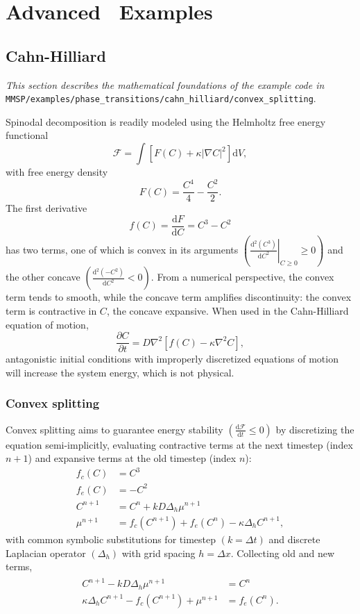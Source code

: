 
\chapter{Advanced \MMSP\ Examples}\label{ch:advanced}

\section{Cahn-Hilliard}
	\emph{This section describes the mathematical foundations of the example code in }
	{\tt MMSP/examples/phase\_transitions/cahn\_hilliard/convex\_splitting}.

	Spinodal decomposition is readily modeled using the Helmholtz free energy functional
	\[\mathcal{F} = \int\left[F(C) + \kappa|\nabla C|^2\right]\mathrm{d}V,\]
	with free energy density
	\[F(C) = \frac{C^4}{4} - \frac{C^2}{2}.\]
	The first derivative
	\[f(C) = \frac{\mathrm{d}F}{\mathrm{d}C} = C^3 - C^2\]
	has two terms, one of which is convex in its arguments $\left(\left.\frac{\mathrm{d}^2(C^3)}{\mathrm{d}C^2}\right|_{C\geq0}\geq0\right)$
	and the other concave $\left(\frac{\mathrm{d}^2(-C^2)}{\mathrm{d}C^2}<0\right)$.
	From a numerical perspective, the convex term tends to smooth, while the concave term
	amplifies discontinuity:
	the convex term is contractive in $C$, the concave expansive.
	When used in the Cahn-Hilliard equation of motion,
	\[\frac{\partial C}{\partial t} = D\nabla^2\left[f(C) - \kappa\nabla^2C\right],\]
	antagonistic initial conditions with improperly discretized equations of motion
	will increase the system energy, which is not physical.
	
	\subsection{Convex splitting}
	Convex splitting aims to guarantee energy stability $\left(\frac{\mathrm{d}\mathcal{F}}{\mathrm{d}t}\leq 0\right)$
	by discretizing the equation semi-implicitly, evaluating contractive terms at the next timestep (index $n+1$)
	and expansive terms at the old timestep (index $n$):
	\begin{align*}
		f_c(C) &= C^3\\
		f_e(C) &= -C^2\\
		C^{n+1} &= C^n + kD\Delta_h\mu^{n+1}\\
		\mu^{n+1} &= f_c(C^{n+1}) + f_e(C^n) - \kappa\Delta_hC^{n+1},
	\end{align*}
	with common symbolic substitutions for timestep $(k=\Delta t)$ and discrete Laplacian operator $(\Delta_h)$
	with grid spacing $h=\Delta x$.	Collecting old and new terms,
	\begin{align}
	\begin{split}
		C^{n+1} - kD\Delta_h\mu^{n+1} &= C^n\\
		\kappa\Delta_hC^{n+1} - f_c(C^{n+1}) + \mu^{n+1} &= f_e(C^n).
	\end{split}
	\label{eqn:convexeom}
	\end{align}
	
